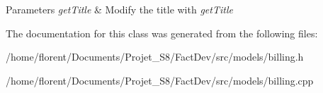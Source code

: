 \begin{DoxyParams}{Parameters}
{\em get\-Title} & Modify the title with {\itshape get\-Title} \\
\hline
\end{DoxyParams}


The documentation for this class was generated from the following files\-:\begin{DoxyCompactItemize}
\item 
/home/florent/\-Documents/\-Projet\-\_\-\-S8/\-Fact\-Dev/src/models/billing.\-h\item 
/home/florent/\-Documents/\-Projet\-\_\-\-S8/\-Fact\-Dev/src/models/billing.\-cpp\end{DoxyCompactItemize}

